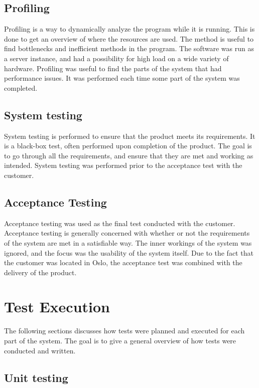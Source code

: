 \subsection{Profiling}

Profiling is a way to dynamically analyze the program while it is running. This is done to get an overview of where the resources are used. The method is useful to find bottlenecks and inefficient methods in the program. The software was run as a server instance, and had a possibility for high load on a wide variety of hardware. Profiling was useful to find the parts of the system that had performance issues. It was performed each time some part of the system was completed.

\subsection{System testing}

System testing is performed to ensure that the product meets its requirements. It is a black-box test, often performed upon completion of the product. The goal is to go through all the requirements, and ensure that they are met and working as intended. System testing was performed prior to the acceptance test with the customer.

\subsection{Acceptance Testing}

Acceptance testing was used as the final test conducted with the customer. Acceptance testing is generally concerned with whether or not the requirements of the system are met in a satisfiable way. The inner workings of the system was ignored, and the focus was the usability of the system itself. Due to the fact that the customer was located in Oslo, the acceptance test was combined with the delivery of the product. 

\section{Test Execution}

The following sections discusses how tests were planned and executed for each part of the system. The goal is to give a general overview of how tests were conducted and written.

\subsection{Unit testing} 

